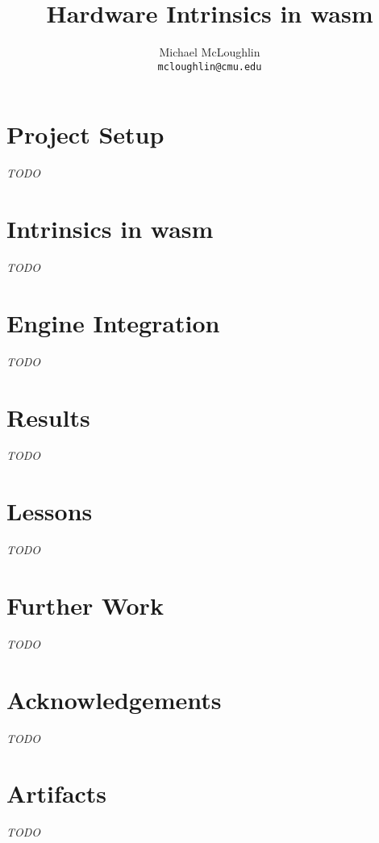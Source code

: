 \documentclass{article}
\newcommand{\wasml}{\acl{wasm}\xspace}
\begin{document}
\title{Hardware Intrinsics in \wasml}
\author{Michael McLoughlin \\ \texttt{mcloughlin@cmu.edu}}
\maketitle



\section{Project Setup}
\emph{TODO}

\section{Intrinsics in \wasml}
\emph{TODO}

\section{Engine Integration}
\emph{TODO}

\section{Results}
\emph{TODO}

\section{Lessons}
\emph{TODO}

\section{Further Work}
\emph{TODO}

\section*{Acknowledgements}
\emph{TODO}

\appendix

\section{Artifacts}
\emph{TODO}

\printbibliography
\end{document}
